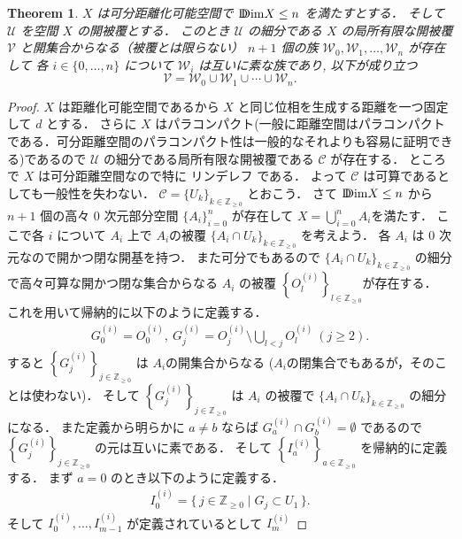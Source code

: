 \documentclass[leqno, a4paper, 12pt]{jsarticle}
\theoremstyle{plain}
\newtheorem{thm}{Theorem}[section]
\theoremstyle{definition}
\theoremstyle{remark}
\newcommand{\zz}{\mathbb{Z}}
\newcommand{\yoddim}{\mathrm{D\hspace{-5.5pt}Dim}}
\newcommand{\yocovf}[1]{\mathscr{#1}}
\numberwithin{equation}{section}
\begin{document}
\begin{thm}\label{thm:main:covcov}
$X$
は可分距離化可能空間で
$\yoddim X\le n$
を満たすとする．
そして
$\yocovf{U}$
を空間
$X$
の開被覆とする．
このとき
$\mathcal{U}$
の細分である
$X$
の局所有限な開被覆
$\yocovf{V}$
と開集合からなる（被覆とは限らない）
$n+1$
個の族
$\yocovf{W}_{0},
\yocovf{W}_{1},\dots,
\yocovf{W}_{n}$
が存在して
各
$i\in \{0, \dots, n\}$
について
$\yocovf{W}_{i}$
は互いに素な族であり,
以下が成り立つ
\[
\yocovf{V}=\yocovf{W}_{0}\cup
\yocovf{W}_{1}\cup\cdots\cup\yocovf{W}_{n}. 
\]
\end{thm}
\begin{proof}
$X$
は距離化可能空間であるから
$X$
と同じ位相を生成する距離を一つ固定して
$d$
とする．
さらに
$X$
はパラコンパクト(一般に距離空間はパラコンパクトである．可分距離空間のパラコンパクト性は一般的なそれよりも容易に証明できる)であるので
$\yocovf{U}$
の細分である局所有限な開被覆である
$\yocovf{C}$
が存在する．
ところで
$X$
は可分距離空間なので特に
リンデレフ
である．
よって
$\yocovf{C}$
は可算であるとしても一般性を失わない．
$\yocovf{C}=\{U_{k}\}_{k\in \zz_{\ge 0}}$
とおこう．
さて
$\yoddim X\le n$
から
$n+1$
個の高々
$0$
次元部分空間
$\{A_{i}\}_{i=0}^{n}$
が存在して
$X=\bigcup_{i=0}^{n}A_{i}$を満たす．
ここで各
$i$
について
$A_{i}$
上で
$A_{i}$の被覆
$\{A_{i}\cap U_{k}\}_{k\in \zz_{\ge 0}}$
を考えよう．
各
$A_{i}$
は
$0$
次元なので開かつ閉な開基を持つ．
また可分でもあるので
$\{A_i\cap U_{k}\}_{k\in \zz_{\ge 0}}$
の細分で高々可算な開かつ閉な集合からなる
$A_{i}$
の被覆
$\left\{O_{l}^{(i)}\right\}_{l\in \zz_{\ge 0}}$が存在する．
これを用いて帰納的に以下のように定義する．
\begin{align}
G_{0}^{(i)}=O_{0}^{(i)},\ G_j^{(i)}=O_j^{(i)}\setminus \bigcup_{l<j}O_l^{(i)}\ (j\ge 2). 
\end{align}
すると
$\left\{G_{j}^{(i)}\right\}_{j\in \zz_{\ge 0}}$
は
$A_{i}$の開集合からなる
($A_i$の閉集合でもあるが，そのことは使わない)．
そして
$\left\{G_{j}^{(i)}\right\}_{j\in \zz_{\ge 0}}$
は
$A_i$
の被覆で
$\{A_i\cap U_{k}\}_{k\in \zz_{\ge 0}}$
の細分になる．
また定義から明らかに
$a\neq b$
ならば
$G_{a}^{(i)}\cap G_b^{(i)}=\emptyset$
であるので
$\left\{G_{j}^{(i)}\right\}_{j\in \zz_{\ge 0}}$
の元は互いに素である．
そして
$\left\{I_{a}^{(i)}\right\}_{a\in \zz_{\ge 0}}$
を帰納的に定義する．
まず
$a=0$
のとき以下のように定義する．
\begin{align}
I_{0}^{(i)}=\{\, j\in \zz_{\ge 0}\mid  G_{j}\subset U_{1}\, \}. 
\end{align}
そして
$I_{0}^{(i)}, \dots, I_{m-1}^{(i)}$
が定義されているとして
$I_{m}^{(i)}$

\end{proof}
\end{document}
